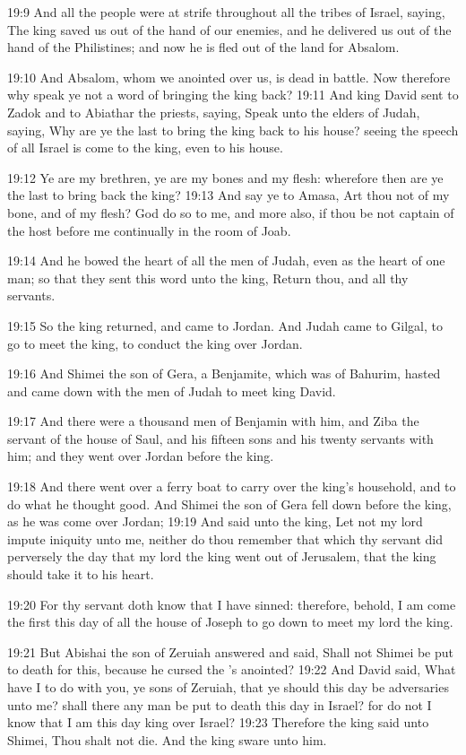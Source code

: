 19:9 And all the people were at strife throughout all the tribes of
Israel, saying, The king saved us out of the hand of our enemies, and
he delivered us out of the hand of the Philistines; and now he is fled
out of the land for Absalom.

19:10 And Absalom, whom we anointed over us, is dead in battle. Now
therefore why speak ye not a word of bringing the king back?  19:11
And king David sent to Zadok and to Abiathar the priests, saying,
Speak unto the elders of Judah, saying, Why are ye the last to bring
the king back to his house? seeing the speech of all Israel is come to
the king, even to his house.

19:12 Ye are my brethren, ye are my bones and my flesh: wherefore then
are ye the last to bring back the king?  19:13 And say ye to Amasa,
Art thou not of my bone, and of my flesh? God do so to me, and more
also, if thou be not captain of the host before me continually in the
room of Joab.

19:14 And he bowed the heart of all the men of Judah, even as the
heart of one man; so that they sent this word unto the king, Return
thou, and all thy servants.

19:15 So the king returned, and came to Jordan. And Judah came to
Gilgal, to go to meet the king, to conduct the king over Jordan.

19:16 And Shimei the son of Gera, a Benjamite, which was of Bahurim,
hasted and came down with the men of Judah to meet king David.

19:17 And there were a thousand men of Benjamin with him, and Ziba the
servant of the house of Saul, and his fifteen sons and his twenty
servants with him; and they went over Jordan before the king.

19:18 And there went over a ferry boat to carry over the king's
household, and to do what he thought good. And Shimei the son of Gera
fell down before the king, as he was come over Jordan; 19:19 And said
unto the king, Let not my lord impute iniquity unto me, neither do
thou remember that which thy servant did perversely the day that my
lord the king went out of Jerusalem, that the king should take it to
his heart.

19:20 For thy servant doth know that I have sinned: therefore, behold,
I am come the first this day of all the house of Joseph to go down to
meet my lord the king.

19:21 But Abishai the son of Zeruiah answered and said, Shall not
Shimei be put to death for this, because he cursed the \LORD's
anointed?  19:22 And David said, What have I to do with you, ye sons
of Zeruiah, that ye should this day be adversaries unto me? shall
there any man be put to death this day in Israel? for do not I know
that I am this day king over Israel?  19:23 Therefore the king said
unto Shimei, Thou shalt not die. And the king sware unto him.

